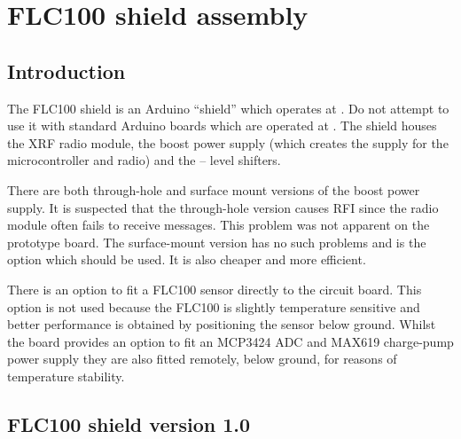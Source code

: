 \chapter{FLC100 shield assembly}

\section{Introduction}
The FLC100 shield is an Arduino ``shield'' which operates at
. Do not attempt to use it with standard Arduino boards
which are operated at . The shield houses the XRF radio
module, the boost power supply (which creates the  supply
for the microcontroller and radio) and the  --  level
shifters.

There are both through-hole and surface mount versions of the boost
power supply. It is suspected that the through-hole version causes RFI
since the radio module often fails to receive messages. This problem
was not apparent on the prototype board. The surface-mount version has
no such problems and is the option which should be used. It is also
cheaper and more efficient.

There is an option to fit a FLC100 sensor directly to the circuit
board. This option is not used because the FLC100 is slightly
temperature sensitive and better performance is obtained by
positioning the sensor below ground. Whilst the board provides an
option to fit an MCP3424 ADC and MAX619 charge-pump power supply they
are also fitted remotely, below ground, for reasons of temperature
stability.

\section{FLC100 shield version 1.0}

